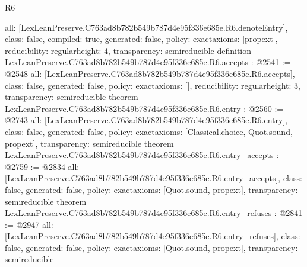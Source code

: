 \begin{lexlean}{R6}
\begin{coremodule}
{  all: [LexLeanPreserve.C763ad8b782b549b787d4e95f336e685e.R6.denoteEntry],
  class: false,
  compiled: true,
  generated: false,
  policy: exact{axioms: [propext]},
  reducibility: regular{height: 4},
  transparency: semireducible
}
definition LexLeanPreserve.C763ad8b782b549b787d4e95f336e685e.R6.accepts : @2541 := @2548 {
  all: [LexLeanPreserve.C763ad8b782b549b787d4e95f336e685e.R6.accepts],
  class: false,
  generated: false,
  policy: exact{axioms: []},
  reducibility: regular{height: 3},
  transparency: semireducible
}
theorem LexLeanPreserve.C763ad8b782b549b787d4e95f336e685e.R6.entry : @2560 := @2743 {
  all: [LexLeanPreserve.C763ad8b782b549b787d4e95f336e685e.R6.entry],
  class: false,
  generated: false,
  policy: exact{axioms: [Classical.choice, Quot.sound, propext]},
  transparency: semireducible
}
theorem LexLeanPreserve.C763ad8b782b549b787d4e95f336e685e.R6.entry_accepts : @2759 := @2834 {
  all: [LexLeanPreserve.C763ad8b782b549b787d4e95f336e685e.R6.entry_accepts],
  class: false,
  generated: false,
  policy: exact{axioms: [Quot.sound, propext]},
  transparency: semireducible
}
theorem LexLeanPreserve.C763ad8b782b549b787d4e95f336e685e.R6.entry_refuses : @2841 := @2947 {
  all: [LexLeanPreserve.C763ad8b782b549b787d4e95f336e685e.R6.entry_refuses],
  class: false,
  generated: false,
  policy: exact{axioms: [Quot.sound, propext]},
  transparency: semireducible
}


\end{coremodule}
\end{lexlean}
